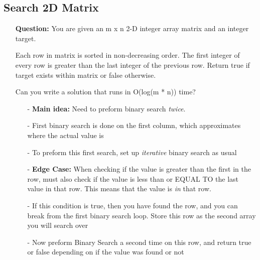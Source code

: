 \documentclass[12pt]{article}
\begin{document}
\subsection{Search 2D Matrix}
\begin{enumerate}
  \item[] \textbf{Question:} You are given an m x n 2-D integer array matrix and an integer target.

  Each row in matrix is sorted in non-decreasing order.
  The first integer of every row is greater than the last integer of the previous row.
  Return true if target exists within matrix or false otherwise.

Can you write a solution that runs in O(log(m * n)) time?
    \begin{enumerate}
      \item[-] \textbf{Main idea:} Need to preform binary search \textit{twice}.
      \item[-] First binary search is done on the first column, which approximates where the actual value is 
      \item[-] To preform this first search, set up \textit{iterative} binary search as usual
      \item[-] \textbf{Edge Case:} When checking if the value is greater than the first in the row, must also check if the value is less than or EQUAL TO the last value in that row. This means that the value is \textit{in} that row.
      \item[-] If this condition is true, then you have found the row, and you can break from the first binary search loop. Store this row as the second array you will search over 
      \item[-] Now preform Binary Search a second time on this row, and return true or false depending on if the value was found or not

    \end{enumerate}
\end{enumerate}
\end{document}
